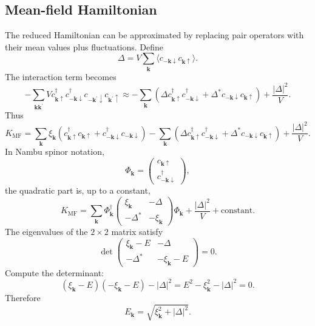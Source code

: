 \documentclass[11pt]{article}
\numberwithin{equation}{section}
\newcommand{\kvec}{\bm{k}}
\newcommand{\kvecp}{\bm{k}^{\prime}}
\begin{document}
\subsection{Mean-field Hamiltonian}

The reduced Hamiltonian can be approximated by replacing pair operators with their mean values plus fluctuations. Define
\begin{equation}
\Delta=V\sum_{\kvec}\langle c_{-\kvec\downarrow}c_{\kvec\uparrow}\rangle.
\end{equation}
The interaction term becomes
\begin{equation}
-\sum_{\kvec\kvecp}V c_{\kvec\uparrow}^{\dagger}c_{-\kvec\downarrow}^{\dagger}c_{-\kvecp\downarrow}c_{\kvecp\uparrow}
\approx
-\sum_{\kvec}\left(\Delta c_{\kvec\uparrow}^{\dagger}c_{-\kvec\downarrow}^{\dagger}+\Delta^* c_{-\kvec\downarrow}c_{\kvec\uparrow}\right)+\frac{|\Delta|^2}{V}.
\end{equation}
Thus
\begin{equation}
K_{\mathrm{MF}}=\sum_{\kvec}\xi_{\kvec}\left(c_{\kvec\uparrow}^{\dagger}c_{\kvec\uparrow}+c_{-\kvec\downarrow}^{\dagger}c_{-\kvec\downarrow}\right)
-\sum_{\kvec}\left(\Delta c_{\kvec\uparrow}^{\dagger}c_{-\kvec\downarrow}^{\dagger}+\Delta^* c_{-\kvec\downarrow}c_{\kvec\uparrow}\right)+\frac{|\Delta|^2}{V}.
\end{equation}
In Nambu spinor notation,
\begin{equation}
\Phi_{\kvec}=\begin{pmatrix}c_{\kvec\uparrow}\\c_{-\kvec\downarrow}^{\dagger}\end{pmatrix},
\end{equation}
the quadratic part is, up to a constant,
\begin{equation}
K_{\mathrm{MF}}=\sum_{\kvec} \Phi_{\kvec}^{\dagger}
\begin{pmatrix}
\xi_{\kvec} & -\Delta\\
-\Delta^* & -\xi_{\kvec}
\end{pmatrix}
\Phi_{\kvec}+\frac{|\Delta|^2}{V}+\text{constant}.
\end{equation}
The eigenvalues of the $2\times 2$ matrix satisfy
\begin{equation}
\det\begin{pmatrix}
\xi_{\kvec}-E & -\Delta\\
-\Delta^* & -\xi_{\kvec}-E
\end{pmatrix}=0.
\end{equation}
Compute the determinant:
\begin{equation}
(\xi_{\kvec}-E)(-\xi_{\kvec}-E)-|\Delta|^2=E^2-\xi_{\kvec}^2-|\Delta|^2=0.
\end{equation}
Therefore
\begin{equation}
\boxed{E_{\kvec}=\sqrt{\xi_{\kvec}^2+|\Delta|^2}.}
\end{equation}
\end{document}
